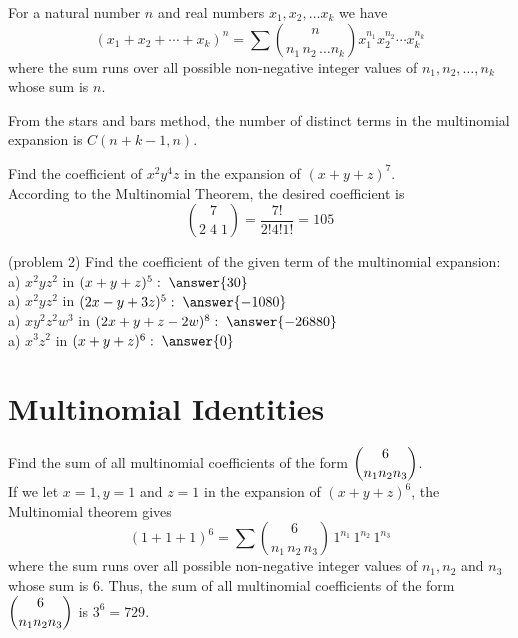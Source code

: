 \documentclass[handout]{ximera}
\begin{document}
\begin{theorem}
For a natural number $n$ and real numbers $x_1, x_2, \dots x_k$ we have
\[
(x_1 + x_2 + \cdots + x_k)^n = \sum \binom{n}{n_1 \, n_2 \, \dots n_k} x_1^{n_1}x_2^{n_2}\cdots x_k^{n_k}
\]
where the sum runs over all possible non-negative integer values of $n_1, n_2, \dots, n_k$ whose sum is $n$.
\end{theorem}

\begin{remark}
From the stars and bars method, the number of distinct terms in the 
multinomial expansion is $C(n+k-1, n)$.
\end{remark}


\begin{example}[example 2]
Find the coefficient of $x^2y^4z$ in the expansion of $(x+y+z)^7$.\\
According to the Multinomial Theorem, the desired coefficient is
\[
\binom{7}{2\;4\;1} = \frac{7!}{2!4!1!} = 105
\]
\end{example}

\begin{problem}(problem 2)
Find the coefficient of the given term of the multinomial expansion:\\
a) $x^2yz^2$ in $(x+y+z)^5: \; \answer{30}$\\
a) $x^2yz^2$ in $(2x-y+3z)^5: \; \answer{-1080}$\\
a) $xy^2z^2w^3$ in $(2x+y+z-2w)^8: \; \answer{-26880}$\\
a) $x^3z^2$ in $(x+y+z)^6: \; \answer{0}$\\
\end{problem}

\section{Multinomial Identities}

\begin{example}[example 3]
Find the sum of all multinomial coefficients of the form $\displaystyle \binom{6}{n_1 n_2 n_3}$.\\
If we let $x = 1, y = 1$ and $z = 1$ in the expansion of $(x+y+z)^6$, the Multinomial theorem gives
\[
(1+1+1)^6 = \sum \binom{6}{n_1 \, n_2 \, n_3} \, 1^{n_1}\, 1^{n_2}\, 1^{n_3}
\]
where the sum runs over all possible non-negative integer values of $n_1, n_2$ and $n_3$ whose sum is 6.
Thus, the sum of all multinomial coefficients of the form $\displaystyle \binom{6}{n_1 n_2 n_3}$ is $3^6 = 729$.
\end{example}
\end{document}
